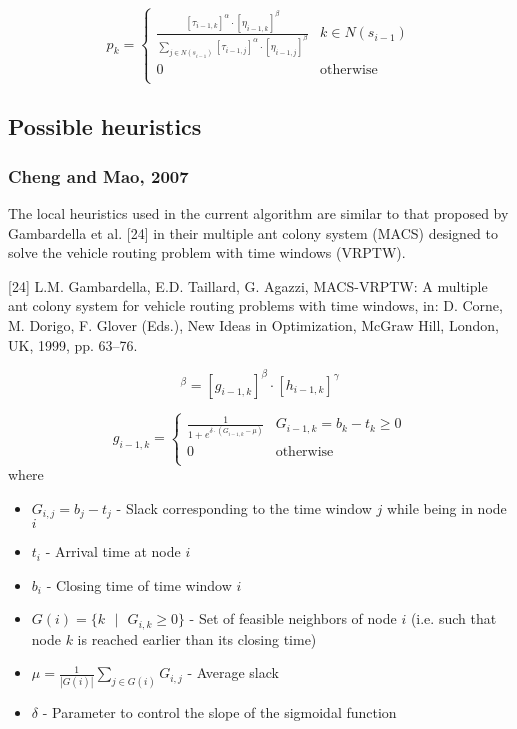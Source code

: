 \begin{homeworkProblem}
\begin{equation}
p_k = \begin{cases}
  \frac{[\tau_{i-1,k}]^\alpha \cdot [\eta_{i-1,k}]^\beta}{\sum_{j \in N(s_{i-1})} [\tau_{i-1,j}]^\alpha \cdot [\eta_{i-1,j}]^\beta} & k \in N(s_{i-1}) \\
 0 & \text{otherwise} \\
\end{cases}
\end{equation}

\subsection{Possible heuristics}
\subsubsection{Cheng and Mao, 2007}
The local heuristics used in the current algorithm are similar to that proposed by Gambardella et al. [24] in their
multiple ant colony system (MACS) designed to solve the vehicle routing problem with time windows (VRPTW).

[24]  L.M. Gambardella, E.D. Taillard, G. Agazzi, MACS-VRPTW: A multiple ant colony system for vehicle routing problems with time windows,
in: D. Corne, M. Dorigo, F. Glover (Eds.), New Ideas in Optimization, McGraw Hill, London, UK, 1999, pp. 63–76.

\begin{equation}
[\eta_{i-1,k}]^\beta = [g_{i-1,k}]^\beta \cdot [h_{i-1,k}]^\gamma
\end{equation}  

\begin{equation}
g_{i-1,k} = \begin{cases}
 \frac{1}{1+e^{\delta \cdot (G_{i-1,k} - \mu)}}  &  G_{i-1,k} = b_k - t_k \geq 0 \\
0 & \text{otherwise} \\
\end{cases}
\end{equation}
where
\begin{itemize}
  \item $G_{i,j} = b_j - t_j$ - Slack corresponding to the time window $j$ while being in node $i$
  \item $t_i$ - Arrival time at node $i$
  \item $b_i$ - Closing time of time window $i$
  \item $G(i) = \{k\text{ } | \text{ }G_{i,k} \geq 0\}$ - Set of feasible neighbors of node $i$ (i.e. such that node $k$ is reached earlier than its closing time)
  \item $\mu = \frac{1}{|G(i)|}\sum_{j \in G(i)}  G_{i,j}$ - Average slack 
  \item $\delta$ - Parameter to control the slope of the sigmoidal function
\end{itemize}


\end{homeworkProblem}
